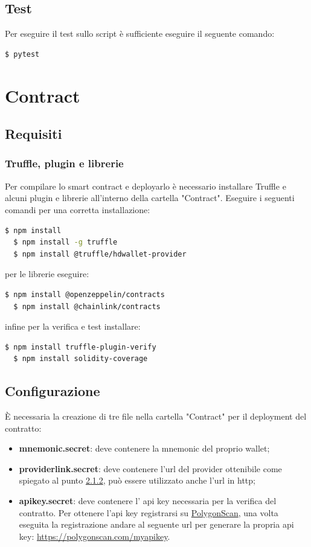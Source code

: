 \documentclass[a4paper, 12pt]{article}
\begin{document}
\subsection{Test}
Per eseguire il test sullo script è sufficiente eseguire il seguente comando:
\begin{lstlisting}[language=bash]
$ pytest
\end{lstlisting}
\section{Contract}
\subsection{Requisiti}
\subsubsection{Truffle, plugin e librerie}
Per compilare lo smart contract e deployarlo è necessario installare Truffle e alcuni plugin e librerie all'interno della cartella "Contract". Eseguire i seguenti comandi per una corretta installazione:
\begin{lstlisting}[language=bash]
  $ npm install
  $ npm install -g truffle
  $ npm install @truffle/hdwallet-provider
\end{lstlisting}
per le librerie eseguire:
\begin{lstlisting}[language=bash]
  $ npm install @openzeppelin/contracts
  $ npm install @chainlink/contracts
\end{lstlisting}
infine per la verifica e test installare:
\begin{lstlisting}[language=bash]
  $ npm install truffle-plugin-verify
  $ npm install solidity-coverage
\end{lstlisting}
\subsection{Configurazione}
È necessaria la creazione di tre file nella cartella "Contract" per il deployment del contratto:
\begin{itemize}
  \item \textbf{mnemonic.secret}: deve contenere la mnemonic del proprio wallet;
  \item \textbf{providerlink.secret}: deve contenere l'url del provider ottenibile come spiegato al punto \hyperref[sec:provider]{2.1.2}, può essere utilizzato anche l'url in http;
  \item \textbf{apikey.secret}: deve contenere l' api key necessaria per la verifica del contratto. Per ottenere l'api key registrarsi su \href{https://polygonscan.com/}{PolygonScan}, una volta eseguita la registrazione andare al seguente url per generare la propria api key: \url{https://polygonscan.com/myapikey}.
\end{itemize}
\end{document}
